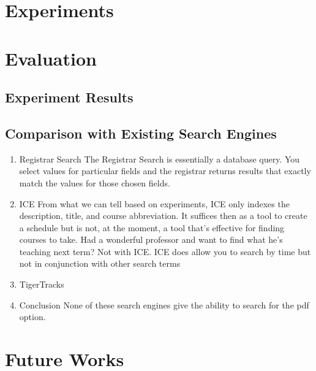 \documentclass[12pt,letterpaper]{article}
\begin{document}
\section{Experiments}

\section{Evaluation}
\subsection{Experiment Results}
\subsection{Comparison with Existing Search Engines}
\begin{enumerate}
\item Registrar Search
  The Registrar Search is essentially a database query. You select values for particular fields and the registrar returns results that exactly match the values for those chosen fields.
  
\item ICE
  From what we can tell based on experiments, ICE only indexes the description, title, and course abbreviation. It suffices then as a tool to create a schedule but is not, at the moment, a tool that's effective for finding courses to take. Had a wonderful professor and want to find what he's teaching next term? Not with ICE. ICE does allow you to search by time but not in conjunction with other search terms 
  
\item TigerTracks
  
\item Conclusion
  None of these search engines give the ability to search for the pdf option. 
\end{enumerate}

\section{Future Works}
\end{document}
